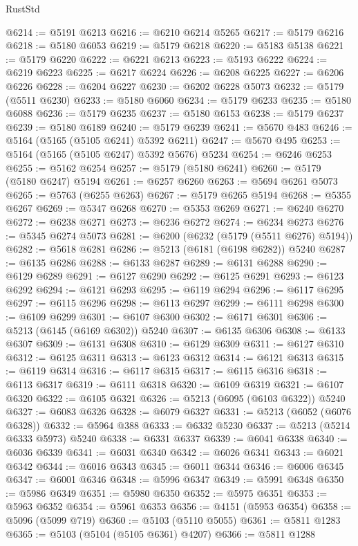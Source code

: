 \begin{lexlean}{RustStd}
\begin{coremodule}
@6214 := @5191 @6213
@6216 := @6210 @6214 @5265
@6217 := @5179 @6216
@6218 := @5180 @6053
@6219 := @5179 @6218
@6220 := @5183 @5138
@6221 := @5179 @6220
@6222 := @6221 @6213
@6223 := @5193 @6222
@6224 := @6219 @6223
@6225 := @6217 @6224
@6226 := @6208 @6225
@6227 := @6206 @6226
@6228 := @6204 @6227
@6230 := @6202 @6228 @5073
@6232 := @5179 (@5511 @6230)
@6233 := @5180 @6060
@6234 := @5179 @6233
@6235 := @5180 @6088
@6236 := @5179 @6235
@6237 := @5180 @6153
@6238 := @5179 @6237
@6239 := @5180 @6189
@6240 := @5179 @6239
@6241 := @5670 @483
@6246 := @5164 (@5165 (@5105 @6241) @5392 @6211)
@6247 := @5670 @495
@6253 := @5164 (@5165 (@5105 @6247) @5392 @5676) @5234
@6254 := @6246 @6253
@6255 := @5162 @6254
@6257 := @5179 (@5180 @6241)
@6260 := @5179 (@5180 @6247) @5194
@6261 := @6257 @6260
@6263 := @5694 @6261 @5073
@6265 := @5763 (@6255 @6263)
@6267 := @5179 @6265 @5194
@6268 := @5355 @6267
@6269 := @5347 @6268
@6270 := @5353 @6269
@6271 := @6240 @6270
@6272 := @6238 @6271
@6273 := @6236 @6272
@6274 := @6234 @6273
@6276 := @5345 @6274 @5073
@6281 := @6200 (@6232 (@5179 (@5511 @6276) @5194))
@6282 := @5618 @6281
@6286 := @5213 (@6181 (@6198 @6282)) @5240
@6287 := @6135 @6286
@6288 := @6133 @6287
@6289 := @6131 @6288
@6290 := @6129 @6289
@6291 := @6127 @6290
@6292 := @6125 @6291
@6293 := @6123 @6292
@6294 := @6121 @6293
@6295 := @6119 @6294
@6296 := @6117 @6295
@6297 := @6115 @6296
@6298 := @6113 @6297
@6299 := @6111 @6298
@6300 := @6109 @6299
@6301 := @6107 @6300
@6302 := @6171 @6301
@6306 := @5213 (@6145 (@6169 @6302)) @5240
@6307 := @6135 @6306
@6308 := @6133 @6307
@6309 := @6131 @6308
@6310 := @6129 @6309
@6311 := @6127 @6310
@6312 := @6125 @6311
@6313 := @6123 @6312
@6314 := @6121 @6313
@6315 := @6119 @6314
@6316 := @6117 @6315
@6317 := @6115 @6316
@6318 := @6113 @6317
@6319 := @6111 @6318
@6320 := @6109 @6319
@6321 := @6107 @6320
@6322 := @6105 @6321
@6326 := @5213 (@6095 (@6103 @6322)) @5240
@6327 := @6083 @6326
@6328 := @6079 @6327
@6331 := @5213 (@6052 (@6076 @6328))
@6332 := @5964 @388
@6333 := @6332 @5230
@6337 := @5213 (@5214 @6333 @5973) @5240
@6338 := @6331 @6337
@6339 := @6041 @6338
@6340 := @6036 @6339
@6341 := @6031 @6340
@6342 := @6026 @6341
@6343 := @6021 @6342
@6344 := @6016 @6343
@6345 := @6011 @6344
@6346 := @6006 @6345
@6347 := @6001 @6346
@6348 := @5996 @6347
@6349 := @5991 @6348
@6350 := @5986 @6349
@6351 := @5980 @6350
@6352 := @5975 @6351
@6353 := @5963 @6352
@6354 := @5961 @6353
@6356 := @4151 (@5953 @6354)
@6358 := @5096 (@5099 @719)
@6360 := @5103 (@5110 @5055)
@6361 := @5811 @1283
@6365 := @5103 (@5104 (@5105 @6361) @4207)
@6366 := @5811 @1288

\end{coremodule}
\end{lexlean}
